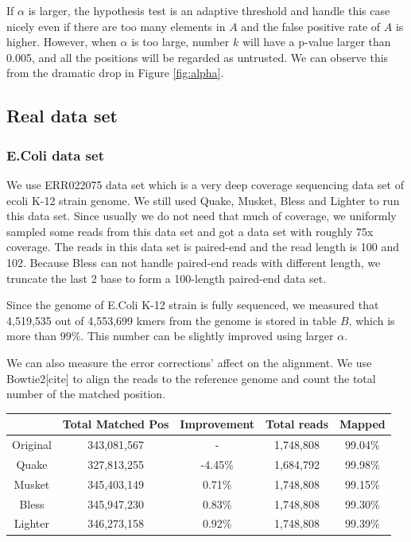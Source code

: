 \documentclass[10pt]{article}
\begin{document}
If $\alpha$ is larger, the hypothesis test is an adaptive threshold and handle this case nicely even if there are too many elements in $A$ and the false positive rate of $A$ is higher. However, when $\alpha$ is too large, number $k$ will have a p-value larger than 0.005, and all the positions will be regarded as untrusted. We can observe this from the dramatic drop in Figure \ref{fig:alpha}.

\subsection*{Real data set}
\subsubsection*{E.Coli data set}
We use ERR022075 data set which is a very deep coverage sequencing data set of ecoli K-12 strain genome. We still used Quake, Musket, Bless and Lighter to run this data set. Since usually we do not need that much of coverage, we uniformly sampled some reads from this data set and got a data set with roughly 75x coverage. The reads in this data set is paired-end and the read length is 100 and 102. Because Bless can not handle paired-end reads with different length, we truncate the last 2 base to form a 100-length paired-end data set.

Since the genome of E.Coli K-12 strain is fully sequenced, we measured that 4,519,535 out of 4,553,699 kmers from the genome is stored in table $B$, which is more than $99\%$. This number can be slightly improved using larger $\alpha$. 
 
We can also measure the error corrections' affect on the alignment. We use Bowtie2[cite] to align the reads to the reference genome and count the total number of the matched position.

\begin{tabular}{|c|c|c|c|c|}\hline
  & Total Matched Pos & Improvement & Total reads & Mapped \\ \hline
Original	& 343,081,567	& - & 1,748,808	& 99.04\% \\ \hline
Quake	& 327,813,255	& -4.45\%	& 1,684,792	& 99.98\% \\ \hline
Musket	& 345,403,149	& 0.71\%	& 1,748,808	& 99.15\% \\ \hline
Bless	& 345,947,230	& 0.83\%	& 1,748,808	& 99.30\% \\ \hline
Lighter	&  346,273,158 & 0.92\%	& 1,748,808	& 99.39\% \\ \hline
\end{tabular}
\end{document}
